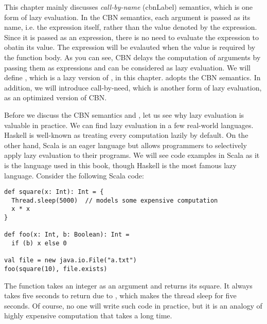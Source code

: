 This chapter mainly discusses \textit{call-by-name}
(\acrshort{cbnLabel}) semantics, which is one form of lazy evaluation.
In the CBN semantics, each argument is passed as its name, i.e. the expression
itself, rather than the value denoted by the expression. Since it is passed as an
expression, there is no need to evaluate the expression to obatin its value. The
expression will be evalauted when the value is required by the function body.
As you can see, CBN delays the computation of arguments by passing them as
expressions and can be considered as lazy evaluation. We will define \lang, which
is a lazy version of \plang, in this chapter. \lang adopts the CBN semantics. In
addition, we will introduce call-by-need, which is another form of lazy
evaluation, as an optimized version of CBN.

Before we discuss the CBN semantics and \lang, let us see why lazy evaluation is
valuable in practice. We can find lazy evaluation in a few real-world languages.
Haskell is well-known as treating every computation lazily by
default. On the
other hand, Scala is an eager language but allows programmers to selectively
apply lazy evaluation to their programs. We will see code examples in Scala as
it is the language used in this book, though Haskell is the most famous lazy
language. Consider the following Scala code:

\begin{verbatim}
def square(x: Int): Int = {
  Thread.sleep(5000)  // models some expensive computation
  x * x
}

def foo(x: Int, b: Boolean): Int =
  if (b) x else 0

val file = new java.io.File("a.txt")
foo(square(10), file.exists)
\end{verbatim}

The function  takes an integer as an argument and returns its
square. It always takes five seconds to return due to ,
which makes the thread sleep for five seconds. Of course, no one will write
such code in practice, but it is an analogy of highly expensive computation that
takes a long time.

